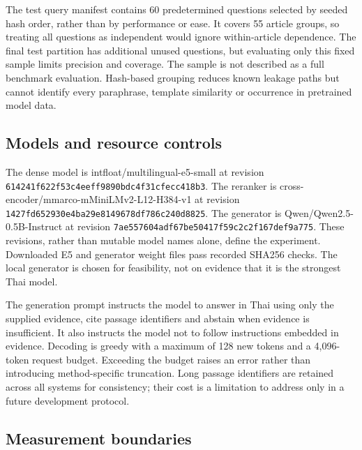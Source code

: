 \documentclass[10pt,a4paper]{article}
\begin{document}
The test query manifest contains 60 predetermined questions selected by
seeded hash order, rather than by performance or ease. It covers 55
article groups, so treating all questions as independent would ignore
within-article dependence. The final test partition has additional
unused questions, but evaluating only this fixed sample limits precision
and coverage. The sample is not described as a full benchmark
evaluation. Hash-based grouping reduces known leakage paths but cannot
identify every paraphrase, template similarity or occurrence in
pretrained model data.

\hypertarget{models-and-resource-controls}{%
\subsection{Models and resource
controls}\label{models-and-resource-controls}}

The dense model is intfloat/multilingual-e5-small at revision
\texttt{614241f6\allowbreak{}22f53c4e\allowbreak{}eff9890b\allowbreak{}dc4f31cf\allowbreak{}ecc418b3}. The reranker is
cross-encoder/mmarco-mMiniLMv2-L12-H384-v1 at revision
\texttt{1427fd65\allowbreak{}2930e4ba\allowbreak{}29e81496\allowbreak{}78df786c\allowbreak{}240d8825}. The generator is
Qwen/Qwen2.5-0.5B-Instruct at revision
\texttt{7ae55760\allowbreak{}4adf67be\allowbreak{}50417f59\allowbreak{}c2c2f167\allowbreak{}def9a775}. These revisions,
rather than mutable model names alone, define the experiment. Downloaded
E5 and generator weight files pass recorded SHA256 checks. The local
generator is chosen for feasibility, not on evidence that it is the
strongest Thai model.

The generation prompt instructs the model to answer in Thai using only
the supplied evidence, cite passage identifiers and abstain when
evidence is insufficient. It also instructs the model not to follow
instructions embedded in evidence. Decoding is greedy with a maximum of
128 new tokens and a 4,096-token request budget. Exceeding the budget
raises an error rather than introducing method-specific truncation. Long
passage identifiers are retained across all systems for consistency;
their cost is a limitation to address only in a future development
protocol.

\hypertarget{measurement-boundaries}{%
\subsection{Measurement boundaries}\label{measurement-boundaries}}
\end{document}
